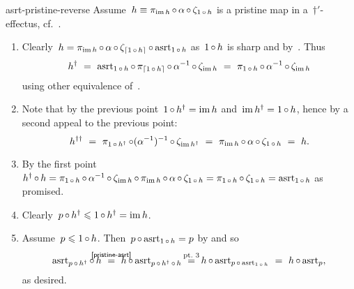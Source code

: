 \begin{solution}{asrt-pristine-reverse}%
Assume~$h \equiv \pi_{\operatorname{im} h} \mathop{\circ} \alpha \mathop{\circ} \zeta_{1 \mathop{\circ} h}$
    is a pristine map in a~$\dagger'$-effectus, cf.~.
\begin{enumerate}
\item
Clearly~$h =\pi_{\operatorname{im} h} \mathop{\circ} \alpha \mathop{\circ} \zeta_{\left\lceil1 \mathop{\circ} h\right\rceil} \mathop{\circ} \mathrm{asrt}_{1 \mathop{\circ} h}$
as~$1 \mathop{\circ} h$ is sharp and by~.
Thus
\begin{equation*}
    h^\dagger \ = \ \mathrm{asrt}_{1 \mathop{\circ} h} \mathop{\circ} \pi_{\left\lceil1 \mathop{\circ} h\right\rceil}
        \mathop{\circ} \alpha^{-1} \mathop{\circ} \zeta_{\operatorname{im} h}
        \ = \ \pi_{1 \mathop{\circ} h} \mathop{\circ} \alpha^{-1} \mathop{\circ} \zeta_{\operatorname{im} h}
\end{equation*}
        using other equivalence of~.
\item
Note that by the previous point~$1 \mathop{\circ} h^\dagger = \operatorname{im} h$
    and~$\operatorname{im} h^\dagger = 1\mathop{\circ} h$, hence
        by a second appeal to the previous point:
\begin{equation*}
    h^{\dagger\dagger}
    \ = \  \pi_{1 \after h^\dagger} \after (\alpha^{-1})^{-1} \after \zeta_{\IM h^\dagger}
    \ = \  \pi_{\IM h} \after \alpha \after \zeta_{1 \after h} \ = \ h.
\end{equation*}
\item
By the first point~$ h^\dagger \mathop{\circ} h
     =  \pi_{1 \mathop{\circ} h} \mathop{\circ} \alpha^{-1} \mathop{\circ} \zeta_{\operatorname{im} h}
        \mathop{\circ} \pi_{\operatorname{im} h} \mathop{\circ} \alpha \mathop{\circ} \zeta_{1 \mathop{\circ} h}
     =  \pi_{1 \mathop{\circ} h} \mathop{\circ} \zeta_{1 \mathop{\circ} h}
     =  \mathrm{asrt}_{1 \mathop{\circ} h}$ as promised.
\item
    Clearly~$p \mathop{\circ} h^\dagger \leqslant 1 \mathop{\circ} h^\dagger = \operatorname{im} h$.
\item
    Assume~$p \leqslant 1 \mathop{\circ} h$.
Then~$p \mathop{\circ} \mathrm{asrt}_{1 \mathop{\circ} h} = p$ by  and
        so~
    \begin{equation*}
        \asrt_{p \after h^\dagger} \after h
                \ \stackrel{\mathclap{\sref{pristine-asrt}}}{=}\
                h \after \asrt_{p \after h^\dagger \after h}
                \ \stackrel{\mathclap{\text{pt.~3}}}{=}\  
                h \after \asrt_{p \after \asrt_{1\after h}}
                \ = \ h \after \asrt_p,
    \end{equation*}
        as desired.
\end{enumerate}
\end{solution}
\spacingfix{}

